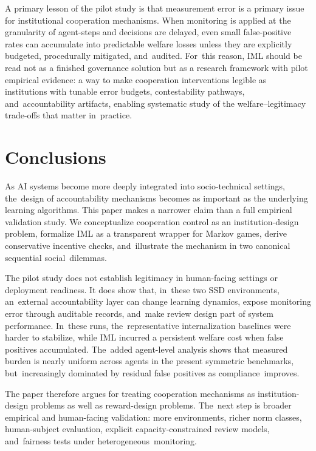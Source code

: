 \documentclass[mca,article,accept,pdftex,oneauthor]{Definitions/mdpi}
\begin{document}
A primary lesson of the pilot study is that measurement error is a primary issue for institutional cooperation mechanisms. When monitoring is applied at the granularity of agent-steps and decisions are delayed, even small false-positive rates can accumulate into predictable welfare losses unless they are explicitly budgeted, procedurally mitigated, and~audited. For~this reason, IML should be read not as a finished governance solution but as a research framework with pilot empirical evidence: a way to make cooperation interventions legible as institutions with tunable error budgets, contestability pathways, and~accountability artifacts, enabling systematic study of the welfare--legitimacy trade-offs that matter in~practice.

\section{Conclusions}

As AI systems become more deeply integrated into socio-technical settings, the~design of accountability mechanisms becomes as important as the underlying learning algorithms. This paper makes a narrower claim than a full empirical validation study. We conceptualize cooperation control as an institution-design problem, formalize IML as a transparent wrapper for Markov games, derive conservative incentive checks, and~illustrate the mechanism in two canonical sequential social~dilemmas.

The pilot study does not establish legitimacy in human-facing settings or deployment readiness. It does show that, in~these two SSD environments, an~external accountability layer can change learning dynamics, expose monitoring error through auditable records, and~make review design part of system performance. In~these runs, the~representative internalization baselines were harder to stabilize, while IML incurred a persistent welfare cost when false positives accumulated. The~added agent-level analysis shows that measured burden is nearly uniform across agents in the present symmetric benchmarks, but~increasingly dominated by residual false positives as compliance~improves.

The paper therefore argues for treating cooperation mechanisms as institution-design problems as well as reward-design problems. The~next step is broader empirical and human-facing validation: more environments, richer norm classes, human-subject evaluation, explicit capacity-constrained review models, and~fairness tests under heterogeneous~monitoring.
\end{document}
